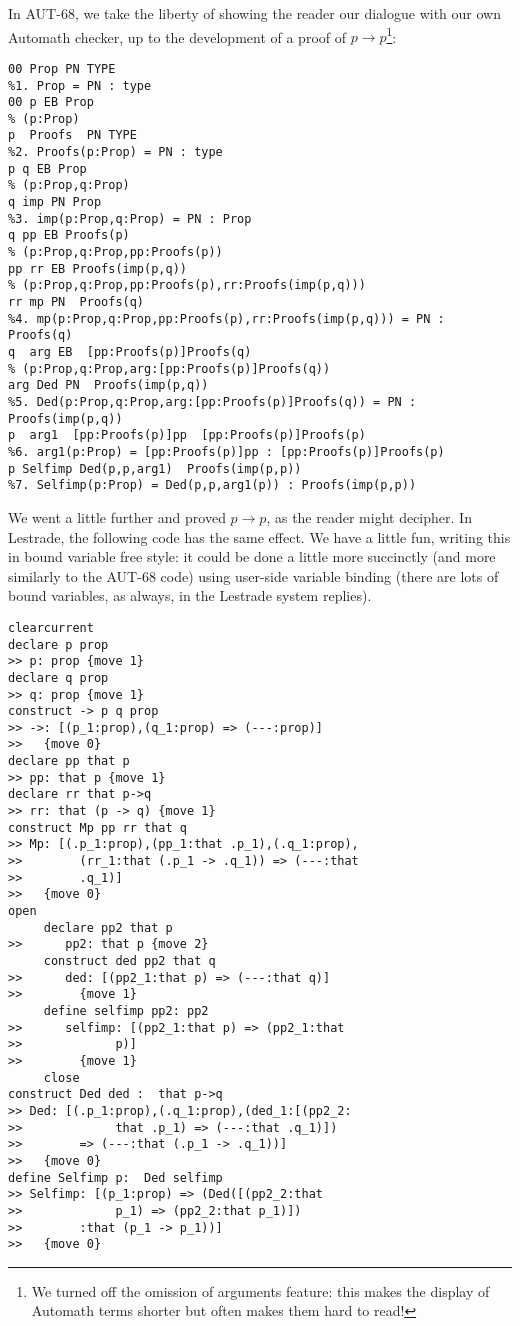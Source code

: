 \documentclass{article}
\begin{document}
In AUT-68, we take the liberty of showing the reader our dialogue with our own Automath checker, up to the development of a proof of $p\rightarrow p$\footnote{We turned off the omission of arguments feature:  this makes the display of Automath terms shorter but often makes them hard to read!}:

   \begin{verbatim}
00 Prop PN TYPE
%1. Prop = PN : type
00 p EB Prop
% (p:Prop)
p  Proofs  PN TYPE
%2. Proofs(p:Prop) = PN : type
p q EB Prop
% (p:Prop,q:Prop)
q imp PN Prop
%3. imp(p:Prop,q:Prop) = PN : Prop
q pp EB Proofs(p)
% (p:Prop,q:Prop,pp:Proofs(p))
pp rr EB Proofs(imp(p,q))
% (p:Prop,q:Prop,pp:Proofs(p),rr:Proofs(imp(p,q)))
rr mp PN  Proofs(q)
%4. mp(p:Prop,q:Prop,pp:Proofs(p),rr:Proofs(imp(p,q))) = PN : Proofs(q)
q  arg EB  [pp:Proofs(p)]Proofs(q)
% (p:Prop,q:Prop,arg:[pp:Proofs(p)]Proofs(q))
arg Ded PN  Proofs(imp(p,q))
%5. Ded(p:Prop,q:Prop,arg:[pp:Proofs(p)]Proofs(q)) = PN : Proofs(imp(p,q))
p  arg1  [pp:Proofs(p)]pp  [pp:Proofs(p)]Proofs(p)
%6. arg1(p:Prop) = [pp:Proofs(p)]pp : [pp:Proofs(p)]Proofs(p)
p Selfimp Ded(p,p,arg1)  Proofs(imp(p,p))
%7. Selfimp(p:Prop) = Ded(p,p,arg1(p)) : Proofs(imp(p,p))
\end{verbatim}

We went a little further and proved $p \rightarrow p$, as the reader might decipher.  In Lestrade, the following code has the same effect.  We have a little fun, writing this in bound variable free style:  it could be done a little more succinctly (and more similarly to the AUT-68 code) using user-side variable binding (there are lots of bound variables, as always, in the Lestrade system replies).

\begin{verbatim}
clearcurrent
declare p prop
>> p: prop {move 1}
declare q prop
>> q: prop {move 1}
construct -> p q prop
>> ->: [(p_1:prop),(q_1:prop) => (---:prop)]
>>   {move 0}
declare pp that p
>> pp: that p {move 1}
declare rr that p->q
>> rr: that (p -> q) {move 1}
construct Mp pp rr that q
>> Mp: [(.p_1:prop),(pp_1:that .p_1),(.q_1:prop),
>>        (rr_1:that (.p_1 -> .q_1)) => (---:that 
>>        .q_1)]
>>   {move 0}
open
     declare pp2 that p
>>      pp2: that p {move 2}
     construct ded pp2 that q
>>      ded: [(pp2_1:that p) => (---:that q)]
>>        {move 1}
     define selfimp pp2: pp2
>>      selfimp: [(pp2_1:that p) => (pp2_1:that 
>>             p)]
>>        {move 1}
     close
construct Ded ded :  that p->q
>> Ded: [(.p_1:prop),(.q_1:prop),(ded_1:[(pp2_2:
>>             that .p_1) => (---:that .q_1)])
>>        => (---:that (.p_1 -> .q_1))]
>>   {move 0}
define Selfimp p:  Ded selfimp
>> Selfimp: [(p_1:prop) => (Ded([(pp2_2:that 
>>             p_1) => (pp2_2:that p_1)])
>>        :that (p_1 -> p_1))]
>>   {move 0}
\end{verbatim}
\end{document}
